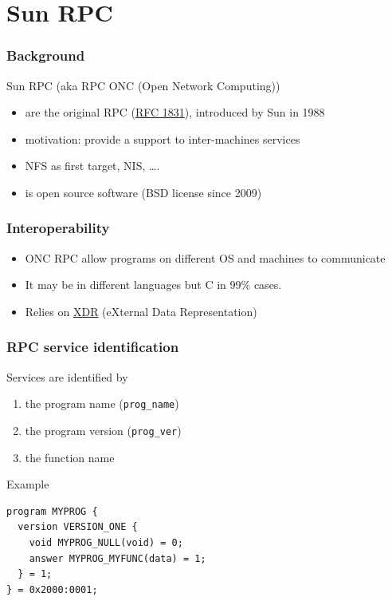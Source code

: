 \documentclass[bigger,hyperref={colorlinks=true, urlcolor=red, plainpages=false, pdfpagelabels, bookmarksnumbered}]{beamer}
\begin{document}
\section{Sun RPC}
\label{sec-2}
\begin{frame}
\frametitle{Background}
\label{sec-2-1}

   Sun RPC  (aka RPC ONC (Open Network Computing)) 
\begin{itemize}
\item are the original RPC (\href{http://tools.ietf.org/html/rfc1831}{RFC 1831}), introduced by Sun in 1988
\item motivation: provide a support to inter-machines services
\item NFS as first target, NIS, \ldots{}.
\item is open source software (BSD license since 2009)
\end{itemize}
\end{frame}
\begin{frame}
\frametitle{Interoperability}
\label{sec-2-2}

\begin{itemize}
\item ONC RPC allow programs on different OS and machines to communicate
\item It may be in different languages but C in 99\% cases.
\item Relies on \href{http://www.ietf.org/rfc/rfc4506.txt}{XDR} (eXternal Data Representation)
\end{itemize}
     
\end{frame}
\begin{frame}[fragile]
\frametitle{RPC service identification}
\label{sec-2-3}
\begin{block}{Services are identified by}
\label{sec-2-3-1}

\begin{enumerate}
\item the program name (\verb~prog_name~)
\item the program version (\verb~prog_ver~)
\item the function name
\end{enumerate}
\end{block}
\begin{beamercolorbox}{Example}
\label{sec-2-3-2}


\lstset{language=C}
\begin{lstlisting}
program MYPROG {
  version VERSION_ONE {
    void MYPROG_NULL(void) = 0;
    answer MYPROG_MYFUNC(data) = 1;
  } = 1;
} = 0x2000:0001;
\end{lstlisting}
 
\end{beamercolorbox}
\end{frame}
\end{document}
